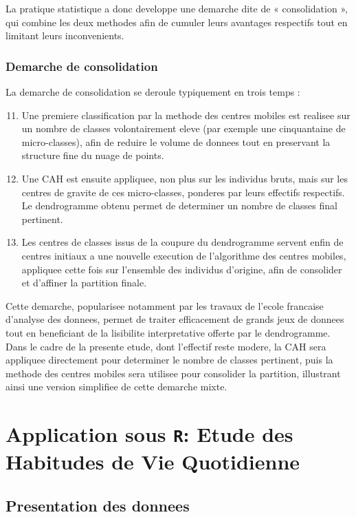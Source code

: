 \documentclass[12pt,a4paper]{book}
\newcommand{\R}{\texttt{R}}
\begin{document}
	La pratique statistique a donc developpe une demarche dite de « consolidation », qui combine les deux methodes afin de cumuler leurs avantages respectifs tout en limitant leurs inconvenients.
	
	\section{Demarche de consolidation}
	
	La demarche de consolidation se deroule typiquement en trois temps :
	
	\begin{enumerate}
		\setcounter{enumi}{10}
		\item Une premiere classification par la methode des centres mobiles est realisee sur un nombre de classes volontairement eleve (par exemple une cinquantaine de micro-classes), afin de reduire le volume de donnees tout en preservant la structure fine du nuage de points.
		\item Une CAH est ensuite appliquee, non plus sur les individus bruts, mais sur les centres de gravite de ces micro-classes, ponderes par leurs effectifs respectifs. Le dendrogramme obtenu permet de determiner un nombre de classes final pertinent.
		\item Les centres de classes issus de la coupure du dendrogramme servent enfin de centres initiaux a une nouvelle execution de l'algorithme des centres mobiles, appliquee cette fois sur l'ensemble des individus d'origine, afin de consolider et d'affiner la partition finale.
	\end{enumerate}
	
	Cette demarche, popularisee notamment par les travaux de l'ecole francaise d'analyse des donnees, permet de traiter efficacement de grands jeux de donnees tout en beneficiant de la lisibilite interpretative offerte par le dendrogramme. Dans le cadre de la presente etude, dont l'effectif reste modere, la CAH sera appliquee directement pour determiner le nombre de classes pertinent, puis la methode des centres mobiles sera utilisee pour consolider la partition, illustrant ainsi une version simplifiee de cette demarche mixte.
	
	\newpage
	
	\part{Application sous \R : Etude des Habitudes de Vie Quotidienne}
	
	\chapter{Presentation des donnees}
	
\end{document}
